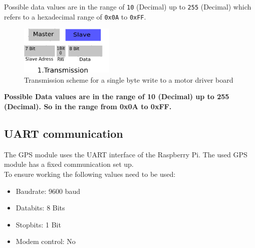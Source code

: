\begin{itemize}
Possible data values are in the range of \texttt{10} (Decimal) up to \texttt{255} (Decimal) which refers to a hexadecimal range of \texttt{0x0A} to \texttt{0xFF}.

\begin{figure}[H]
	\centering\includegraphics[width=0.4\textwidth]{fig/I2C_Adressing/Motor_write}
	\caption[Scheme for a single byte write to a motor driver board]{Transmission scheme for a single byte write to a motor driver board}
	\label{fig:Motor}
\end{figure}



\textbf{Possible Data values are in the range of 10 (Decimal) up to 255 (Decimal). So in the range from 0x0A to 0xFF.}

\end{itemize}

\subsection{UART communication}
\label{sec:hardware:Components:UART}
The GPS module uses the UART interface of the Raspberry Pi. The used GPS module has a fixed communication set up.\\
To ensure working the following values need to be used:
\begin{itemize}
	\item Baudrate: 9600 baud
	\item Databits: 8 Bits
	\item Stopbits:	1 Bit
	\item Modem control: No
\end{itemize}


